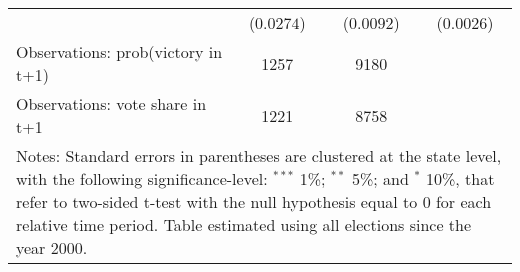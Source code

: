 \begin{table}[htbp]
{\begin{tabular}{lccc}
& ($ 0.0274$) & ($ 0.0092 $)  & ($ 0.0026 $)\\
\addlinespace
Observations: prob(victory in t+1)      &            1257        &     9180  \\
Observations: vote share in t+1      &            1221        &     8758  \\
\hline \hline
\multicolumn{4}{p{1\textwidth}}{\footnotesize{Notes: Standard errors in parentheses are clustered at the state level, with the following significance-level: $^{***}$ 1\%; $^{**}$ 5\%; and $^*$ 10\%, that refer to two-sided t-test with the null hypothesis equal to 0 for each relative time period. Table estimated using all elections since the year 2000.}}
\end{tabular}
}
\end{table}
